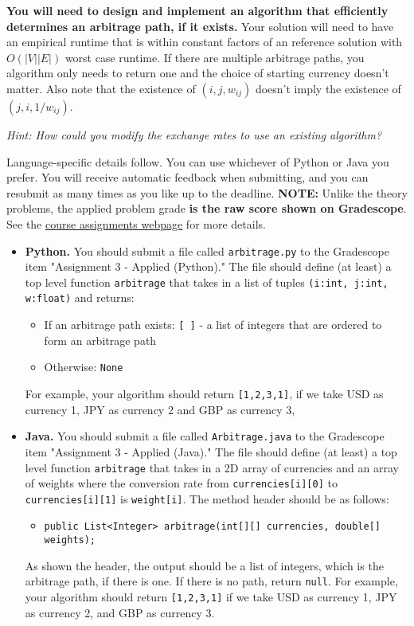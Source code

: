 \documentclass[11pt]{article}
\begin{document}
\textbf{You will need to design and implement an algorithm that efficiently determines an arbitrage path, if it exists.} Your solution will need to have an empirical runtime that is within constant factors of an reference solution with  $O(|V||E|)$ worst case runtime. If there are multiple arbitrage paths, you algorithm only needs to return one and the choice of starting currency doesn't matter. Also note that the existence of $(i,j, w_{ij})$ doesn't imply the existence of $(j,i, 1/w_{ij})$.

\textit{Hint: How could you modify the exchange rates to use an existing algorithm? } 

Language-specific details follow. You can use whichever of Python or Java you prefer. You will receive automatic feedback when submitting, and you can resubmit as many times as you like up to the deadline. \textbf{NOTE:} Unlike the theory problems, the applied problem grade \textbf{is the raw score shown on Gradescope}. See the \href{https://sites.duke.edu/spring24compsci330/assignments/}{course assignments webpage} for more details. 

\begin{itemize}
	\item \textbf{Python.} You should submit a file called \texttt{arbitrage.py} to the Gradescope item "Assignment 3 - Applied (Python)." The file should define (at least) a top level function \texttt{arbitrage} that takes in a list of tuples \texttt{(i:int, j:int, w:float)} and returns:
	\begin{itemize}
	    \item If an arbitrage path exists: \texttt{[\ ]} - a list of integers that are ordered to form an arbitrage path
	    \item Otherwise: \texttt{None}
	\end{itemize}
	For example, your algorithm should return \texttt{[1,2,3,1]}, if we take USD as currency 1, JPY as currency 2 and GBP as currency 3,
	

\item \textbf{Java.} You should submit a file called \texttt{Arbitrage.java} to the Gradescope item "Assignment 3 - Applied (Java)." The file should define (at least) a top level function \texttt{arbitrage} that takes in a 2D array of currencies and an array of weights where the conversion rate from \texttt{currencies[i][0]} to \texttt{currencies[i][1]} is \texttt{weight[i]}. The method header should be as follows: 
    \begin{itemize}
        \item \texttt{public List<Integer> arbitrage(int[][] currencies, double[] weights);}
    \end{itemize}
    As shown the header, the output should be a list of integers, which is the arbitrage path, if there is one. If there is no path, return \texttt{null}. For example, your algorithm should return \texttt{[1,2,3,1]} if we take USD as currency 1, JPY as currency 2, and GBP as currency 3.
\end{itemize}
\end{document}
